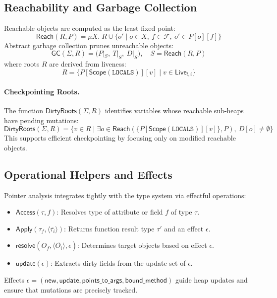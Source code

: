 \subsection{Reachability and Garbage Collection}

Reachable objects are computed as the least fixed point:
\[
\mathsf{Reach}(R,P) = \mu X.\; R \cup \{ o' \mid o \in X,\ f \in \mathcal{F},\ o' \in P[o][f] \}
\]
Abstract garbage collection prunes unreachable objects:
\[
\mathsf{GC}(\Sigma,R) = \big( P|_S,\ T|_S,\ D|_S \big),
\quad
S = \mathsf{Reach}(R,P)
\]
where roots \(R\) are derived from liveness:
\[
R = \big\{ P[\mathsf{Scope}(\mathtt{LOCALS})][v] \mid v \in \mathsf{Live}_{l,i} \big\}
\]

\paragraph{Checkpointing Roots.}
The function \(\mathsf{DirtyRoots}(\Sigma,R)\) identifies variables whose reachable sub-heaps have pending mutations:
\[
\mathsf{DirtyRoots}(\Sigma,R)
    = \{ v \in R \mid \exists o \in \mathsf{Reach}(\{P[\mathsf{Scope}(\mathtt{LOCALS})][v]\},P),\ D[o] \neq \emptyset \}
\]
This supports efficient checkpointing by focusing only on modified reachable objects.

\subsection{Operational Helpers and Effects}

Pointer analysis integrates tightly with the type system via effectful operations:
\begin{itemize}
    \item \(\mathsf{Access}(\tau,f)\): Resolves type of attribute or field \(f\) of type \(\tau\).
    \item \(\mathsf{Apply}(\tau_f,\langle\overline{\tau_i}\rangle)\): Returns function result type \(\tau'\) and an effect \(\epsilon\).
    \item \(\mathsf{resolve}(O_f,\langle\overline{O_i}\rangle,\epsilon)\): Determines target objects based on effect \(\epsilon\).
    \item \(\mathsf{update}(\epsilon)\): Extracts dirty fields from the update set of \(\epsilon\).
\end{itemize}
Effects \(\epsilon = (\mathsf{new},\mathsf{update},\mathsf{points\_to\_args},\mathsf{bound\_method})\) guide heap updates and ensure that mutations are precisely tracked.

